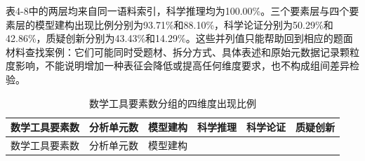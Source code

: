 \documentclass[
  12pt,
  a4paper]{ctexbook}
\begin{document}
表4-8中的两层均来自同一语料索引，科学推理均为100.00\%。三个要素层与四个要素层的模型建构出现比例分别为93.71\%和88.10\%，科学论证分别为50.29\%和42.86\%，质疑创新分别为43.43\%和14.29\%。这些并列值只能帮助回到相应的题面材料查找案例：它们可能同时受题材、拆分方式、具体表述和原始元数据记录颗粒度影响，不能说明增加一种表征会降低或提高任何维度要求，也不构成组间差异检验。

\begin{longtable}[]{@{}
  >{\raggedright\arraybackslash}p{}
  >{\raggedleft\arraybackslash}p{}
  >{\raggedleft\arraybackslash}p{}
  >{\raggedleft\arraybackslash}p{}
  >{\raggedleft\arraybackslash}p{}
  >{\raggedleft\arraybackslash}p{}@{}}
\caption{数学工具要素数分组的四维度出现比例}\tabularnewline
\toprule\noalign{}
\rowcolor{ThesisPale}
\begin{minipage}[b]{\linewidth}\raggedright
数学工具要素数
\end{minipage} & \begin{minipage}[b]{\linewidth}\raggedleft
分析单元数
\end{minipage} & \begin{minipage}[b]{\linewidth}\raggedleft
模型建构
\end{minipage} & \begin{minipage}[b]{\linewidth}\raggedleft
科学推理
\end{minipage} & \begin{minipage}[b]{\linewidth}\raggedleft
科学论证
\end{minipage} & \begin{minipage}[b]{\linewidth}\raggedleft
质疑创新
\end{minipage} \\
\midrule\noalign{}
\endfirsthead
\toprule\noalign{}
\rowcolor{ThesisPale}
\begin{minipage}[b]{\linewidth}\raggedright
数学工具要素数
\end{minipage} & \begin{minipage}[b]{\linewidth}\raggedleft
分析单元数
\end{minipage} & \begin{minipage}[b]{\linewidth}\raggedleft
模型建构
\end{minipage} & \begin{minipage}[b]{\linewidth}\raggedleft

\end{minipage}
\end{longtable}
\end{document}
